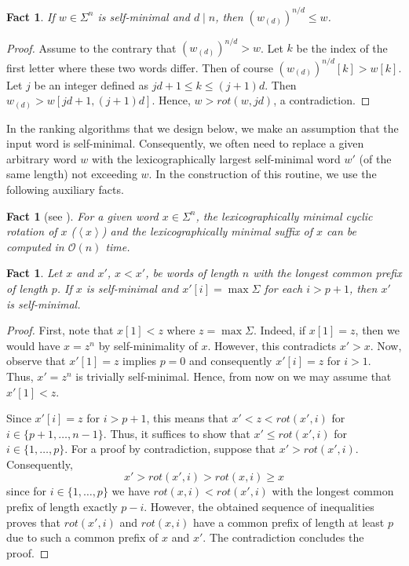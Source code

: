 \documentclass{article}
\newcommand{\mayqed}{}
\newcommand{\Oh}{\mathcal{O}}
\newcommand{\rot}{\mathit{rot}}
\newcommand{\minrot}[1]{\left\langle #1 \right\rangle}
\newtheorem{fact}[theorem]{Fact}
\theoremstyle{definition}
\theoremstyle{remark}
\begin{document}
\begin{fact}\label{fct:lynd}
  If $w \in \Sigma^n$ is self-minimal and $d \mid n$, then
  $(w_{(d)})^{n/d} \le w$.
\end{fact}
\begin{proof}
  Assume to the contrary that $(w_{(d)})^{n/d} > w$.
  Let $k$ be the index of the first letter where these two words differ.
  Then of course $(w_{(d)})^{n/d}[k] > w[k]$.
  Let $j$ be an integer defined as $jd+1 \le k \le (j+1)d$.
  Then $w_{(d)} > w[jd+1,(j+1)d]$.
  Hence, $w>\rot(w,jd)$, a contradiction.
\mayqed\end{proof}



In the ranking algorithms that we design below, we make an assumption that
the input word is self-minimal.
Consequently, we often need to replace a given arbitrary word $w$ with
the lexicographically largest self-minimal word $w'$ (of the same length) not exceeding $w$.
In the construction of this routine, we use the following auxiliary facts.

\begin{fact}[see \cite{DBLP:journals/jal/Duval83}]\label{fct:minrot}
  For a given word $x\in \Sigma^n$, the lexicographically minimal cyclic rotation of $x$ ($\minrot{x}$) and the lexicographically minimal suffix of $x$ can be computed in $\Oh(n)$ time.
\end{fact}

  \begin{fact}\label{fct:prvaux}
    Let $x$ and $x'$, $x < x'$, be words of length $n$ with the longest common prefix of length $p$.
    If $x$ is self-minimal and $x'[i]=\max\Sigma$ for each $i > p+1$, then $x'$ is self-minimal.
  \end{fact}
  \begin{proof}
    First, note that $x[1]<z$ where $z=\max\Sigma$.
    Indeed, if $x[1]=z$, then we would have $x=z^{n}$ by self-minimality of $x$.
    However, this contradicts $x'>x$.
    Now, observe that $x'[1]=z$ implies $p=0$ and consequently $x'[i]=z$ for $i>1$.
    Thus, $x'=z^n$ is trivially self-minimal.
    Hence, from now on we may assume that $x'[1]<z$.

    Since $x'[i]=z$ for $i>p+1$, this means that $x'<z<\rot(x',i)$ for $i\in \{p+1,\ldots,n-1\}$.
    Thus, it suffices to show that $x'\le \rot(x',i)$ for $i\in \{1,\ldots,p\}$.
    For a proof by contradiction, suppose that $x' > \rot(x',i)$. Consequently,
    \[x' > \rot(x',i) > \rot(x,i) \ge x\]
    since for $i\in\{1,\ldots,p\}$ we have $\rot(x,i)<\rot(x',i)$ with the longest common prefix of length exactly $p-i$.
    However, the obtained sequence of inequalities proves that $\rot(x',i)$ and $\rot(x,i)$
    have a common prefix of length at least $p$ due to such a common prefix of $x$ and $x'$.
    The contradiction concludes the proof.
  \mayqed\end{proof}
\end{document}
